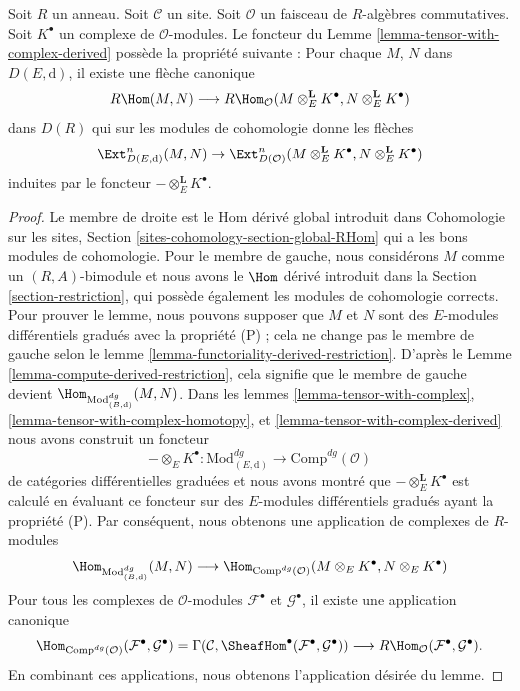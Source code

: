\begin{lemma}
\label{lemma-upgrade-tensor-with-complex-derived}
Soit $R$ un anneau. Soit $\mathcal{C}$ un site. Soit $\mathcal{O}$ un faisceau
de $R$-algèbres commutatives. Soit $K^\bullet$ un complexe de
$\mathcal{O}$-modules. Le foncteur du Lemme
\ref{lemma-tensor-with-complex-derived} possède la propriété suivante : Pour
chaque $M$, $N$ dans $D(E, \text{d})$, il existe une flèche canonique
$$
R\Hom(M, N)
\longrightarrow
R\Hom_\mathcal{O}(M \otimes_E^\mathbf{L} K^\bullet,
N \otimes_E^\mathbf{L} K^\bullet)
$$
dans $D(R)$ qui sur les modules de cohomologie donne les flèches
$$
\Ext^n_{D(E, \text{d})}(M, N) \to
\Ext^n_{D(\mathcal{O})}
(M \otimes_E^\mathbf{L} K^\bullet, N \otimes_E^\mathbf{L} K^\bullet)
$$
induites par le foncteur $- \otimes_E^\mathbf{L} K^\bullet$.
\end{lemma}

\begin{proof}
Le membre de droite est le Hom dérivé global introduit dans Cohomologie sur
les sites, Section \ref{sites-cohomology-section-global-RHom} qui a les bons
modules de cohomologie. Pour le membre de gauche, nous considérons $M$ comme un $(R,
A)$-bimodule et nous avons le $\Hom$ dérivé introduit dans la Section
\ref{section-restriction}, qui possède également les modules de cohomologie
corrects. Pour prouver le lemme, nous pouvons supposer que $M$ et $N$ sont des
$E$-modules différentiels gradués avec la propriété (P) ; cela ne change pas le
membre de gauche selon le lemme
\ref{lemma-functoriality-derived-restriction}. D'après le Lemme
\ref{lemma-compute-derived-restriction}, cela signifie que le membre de
gauche devient
$\Hom_{\text{Mod}^{dg}_{(B, \text{d})}}(M, N)$. Dans les lemmes
\ref{lemma-tensor-with-complex}, \ref{lemma-tensor-with-complex-homotopy}, et
\ref{lemma-tensor-with-complex-derived} nous avons construit un foncteur
$$
- \otimes_E K^\bullet :
\text{Mod}^{dg}_{(E, \text{d})}
\longrightarrow
\text{Comp}^{dg}(\mathcal{O})
$$
de catégories différentielles graduées et nous avons montré que $-
\otimes_E^\mathbf{L} K^\bullet$ est calculé en évaluant ce foncteur sur des
$E$-modules différentiels gradués ayant la propriété (P). Par conséquent, nous
obtenons une application de complexes de $R$-modules
$$
\Hom_{\text{Mod}^{dg}_{(B, \text{d})}}(M, N)
\longrightarrow
\Hom_{\text{Comp}^{dg}(\mathcal{O})}
(M \otimes_E K^\bullet, N \otimes_E K^\bullet)
$$
Pour tous les complexes de $\mathcal{O}$-modules $\mathcal{F}^\bullet$ et
$\mathcal{G}^\bullet$, il existe une application canonique
$$
\Hom_{\text{Comp}^{dg}(\mathcal{O})}
(\mathcal{F}^\bullet, \mathcal{G}^\bullet) =
\Gamma(\mathcal{C},
\SheafHom^\bullet(\mathcal{F}^\bullet, \mathcal{G}^\bullet))
\longrightarrow
R\Hom_\mathcal{O}(\mathcal{F}^\bullet, \mathcal{G}^\bullet).
$$
En combinant ces applications, nous obtenons l'application désirée du lemme.
\end{proof}

